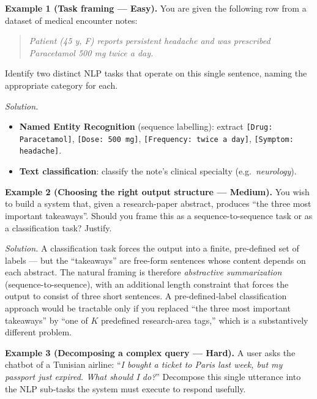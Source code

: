 \documentclass[12pt,a4paper]{report}
\theoremstyle{definition}
\theoremstyle{remark}
\begin{document}
\textbf{Example 1 (Task framing --- Easy).}
You are given the following row from a dataset of medical encounter notes:
\begin{quote}
\emph{Patient (45 y, F) reports persistent headache and was prescribed Paracetamol 500 mg twice a day.}
\end{quote}
Identify two distinct NLP tasks that operate on this single sentence, naming the appropriate category for each.

\textit{Solution.}
\begin{itemize}
    \item \textbf{Named Entity Recognition} (sequence labelling): extract \texttt{[Drug: Paracetamol]}, \texttt{[Dose: 500 mg]}, \texttt{[Frequency: twice a day]}, \texttt{[Symptom: headache]}.
    \item \textbf{Text classification}: classify the note's clinical specialty (e.g.\ \emph{neurology}).
\end{itemize}

\medskip

\textbf{Example 2 (Choosing the right output structure --- Medium).}
You wish to build a system that, given a research-paper abstract, produces ``the three most important takeaways''. Should you frame this as a sequence-to-sequence task or as a classification task? Justify.

\textit{Solution.} A classification task forces the output into a finite, pre-defined set of labels --- but the ``takeaways'' are free-form sentences whose content depends on each abstract. The natural framing is therefore \emph{abstractive summarization} (sequence-to-sequence), with an additional length constraint that forces the output to consist of three short sentences.
A pre-defined-label classification approach would be tractable only if you replaced ``the three most important takeaways'' by ``one of $K$ predefined research-area tags,'' which is a substantively different problem.

\medskip

\textbf{Example 3 (Decomposing a complex query --- Hard).}
A user asks the chatbot of a Tunisian airline: ``\emph{I bought a ticket to Paris last week, but my passport just expired. What should I do?}'' Decompose this single utterance into the NLP sub-tasks the system must execute to respond usefully.
\end{document}
